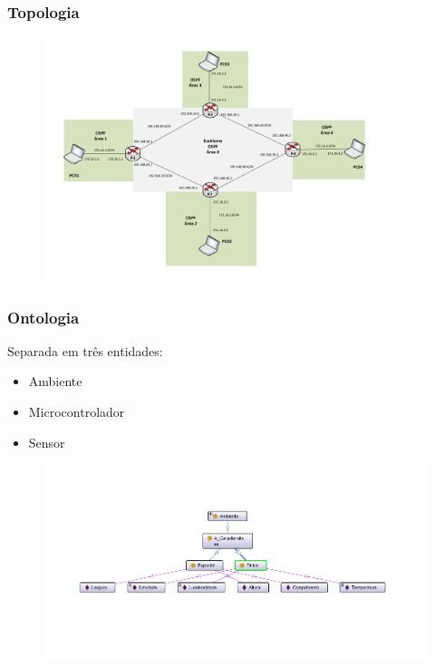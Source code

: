 \begin{frame}
	\frametitle{Topologia}

	\begin{figure}[h]
		\centering
		\includegraphics[width=0.9\textwidth]{"../Relatorio/Artigo IoT-G4/figs/topologia-2"}
		\label{topologia}
 	\end{figure}

\end{frame}


\begin{frame}
	\frametitle{Ontologia}
	Separada em três entidades:
	\begin{itemize}
		\item Ambiente
		\item Microcontrolador
		\item Sensor
	\end{itemize}

	\begin{figure}[h]
		\centering
		\includegraphics[width=1.1\textwidth]{"../Relatorio/Artigo IoT-G4/figs/Ambiente"}
		\label{topologia}
 	\end{figure}

\end{frame}

